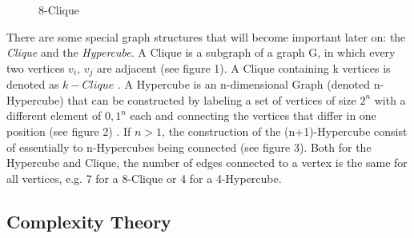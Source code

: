 \documentclass[12pt,a4paper]{article}
\begin{document}
\newpage
\begin{wrapfigure}{r}{4cm}
	
	\caption{8-Clique}
\end{wrapfigure}
\par There are some special graph structures that will become important later on: the \textit{Clique} and the \textit{Hypercube}. A Clique is a subgraph of a graph G, in which every two vertices $v_i$, $v_j$ are adjacent (see figure 1).  A Clique containing k vertices is denoted as $k-Clique$ \citep[pp. 21, 111]{Gross2013}.
\newline
\newline
A Hypercube is an n-dimensional Graph (denoted n-Hypercube) that can be constructed by labeling a set of vertices of size $2^n$ with a different element of ${0, 1}^n$ each and connecting the vertices that differ in one position (see figure 2) \citep[p. 60]{Bollobas1998}. If $n > 1$, the construction of the (n+1)-Hypercube consist of essentially to n-Hypercubes being connected (see figure 3). Both for the Hypercube and Clique, the number of edges connected to a vertex is the same for all vertices, e.g. 7 for a 8-Clique or 4 for a 4-Hypercube.
\newline

\par
\begin{figure}[h]
\begin{minipage}{.3\textwidth}
	
\end{minipage}
\begin{minipage}{.5\textwidth}
	
	\centering
	 	
\end{minipage}
\end{figure}

\newpage
\subsection{Complexity Theory}
\end{document}
